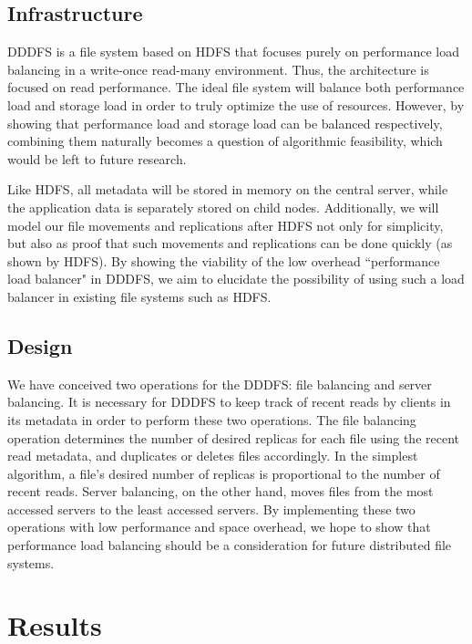 \documentclass[twoside]{article}
\begin{document}
\begin{multicols}{2}
\subsection*{Infrastructure}

DDDFS is a file system based on HDFS that focuses purely on performance load balancing in a write-once read-many environment. Thus, the architecture is focused on read performance. The ideal file system will balance both performance load and storage load in order to truly optimize the use of resources. However, by showing that performance load and storage load can be balanced respectively, combining them naturally becomes a question of algorithmic feasibility, which would be left to future research.\\\indent

Like HDFS, all metadata will be stored in memory on the central server, while the application data is separately stored on child nodes. Additionally, we will model our file movements and replications after HDFS not only for simplicity, but also as proof that such movements and replications can be done quickly (as shown by HDFS). By showing the viability of the low overhead ``performance load balancer" in DDDFS, we aim to elucidate the possibility of using such a load balancer in existing file systems such as HDFS.\\\indent

\subsection*{Design}

We have conceived two operations for the DDDFS: file balancing and server balancing. It is necessary for DDDFS to keep track of recent reads by clients in its metadata in order to perform these two operations.  The file balancing operation determines the number of desired replicas for each file using the recent read metadata, and duplicates or deletes files accordingly. In the simplest algorithm, a file’s desired number of replicas is proportional to the number of recent reads. Server balancing, on the other hand, moves files from the most accessed servers to the least accessed servers. By implementing these two operations with low performance and space overhead, we hope to show that performance load balancing should be a consideration for future distributed file systems.



\section{Results}


\end{multicols}
\end{document}
